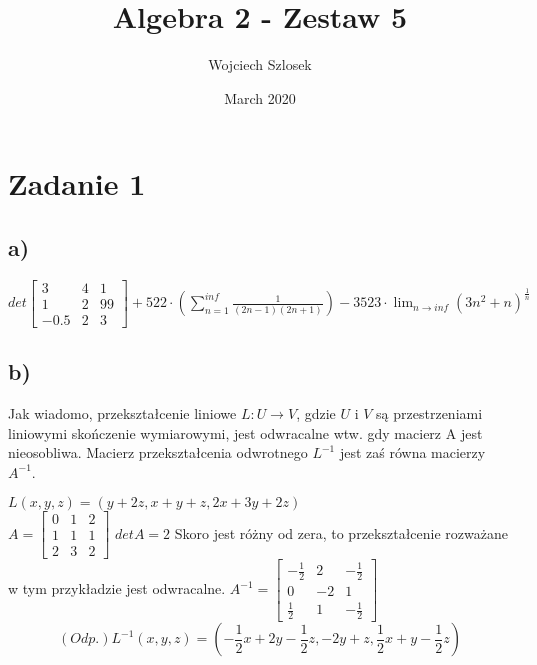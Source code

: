 \documentclass{article}
\title{Algebra 2 - Zestaw 5}
\author{Wojciech Szlosek}
\date{March 2020}
\begin{document}
\maketitle

\section{Zadanie 1}

\subsection{a)}

$det \left[\begin{array}{ccc}
3 & 4 & 1 \\
1 & 2 & 99\\
-0.5 & 2 & 3\end{array}\right] + 522 \cdot (\sum_{n=1}^{inf} \frac{1}{(2n-1)(2n+1)} )- 3523 \cdot \lim_{n \to inf} (3n^2 +n)^{\frac{1}{n}}$



\subsection{b)}

Jak wiadomo, przekształcenie liniowe $L: U \to V$, gdzie $U$ i $V$ są przestrzeniami liniowymi skończenie wymiarowymi, jest odwracalne wtw. gdy macierz A jest nieosobliwa. Macierz przekształcenia odwrotnego $L^{-1}$ jest zaś równa macierzy $A^{-1}$. \newline

$L(x,y,z) = (y+2z,x+y+z,2x+3y+2z)$ \\ \newline
$A = \left[\begin{array}{ccc}
0 & 1 & 2 \\
1 & 1 & 1 \\
2 & 3 & 2 \end{array}\right]$
$det A = 2$ \newline \newline 
Skoro jest różny od zera, to przekształcenie rozważane w tym przykładzie jest odwracalne. \newline \newline
$A^{-1} = \left[\begin{array}{ccc}
-\frac{1}{2} & 2 & -\frac{1}{2} \\
0 & -2 & 1 \\
\frac{1}{2} & 1 & -\frac{1}{2} \end{array}\right]$ \newline
$$(Odp.) L^{-1}(x,y,z) = (-\frac{1}{2}x+2y-\frac{1}{2}z,-2y+z,\frac{1}{2}x+y-\frac{1}{2}z)$$
\end{document}
